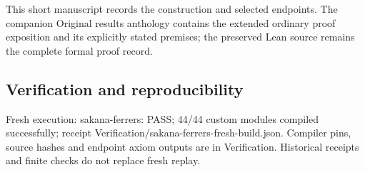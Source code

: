 \documentclass[11pt,a4paper]{article}
\begin{document}
{\small This short manuscript records the construction and selected endpoints. The companion Original results anthology contains the extended ordinary proof exposition and its explicitly stated premises; the preserved Lean source remains the complete formal proof record.\par}

\subsection{Verification and reproducibility}
Fresh execution: sakana-ferrers: PASS; 44/44 custom modules compiled successfully; receipt Verification/sakana-ferrers-fresh-build.json. Compiler pins, source hashes and endpoint axiom outputs are in Verification. Historical receipts and finite checks do not replace fresh replay.
\end{document}
